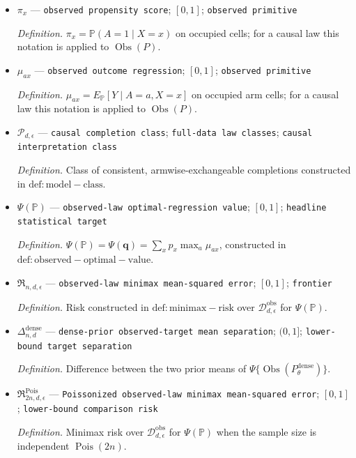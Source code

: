 \documentclass{article}
\begin{document}
\begin{itemize}
  \par\smallskip\noindent\emph{Definition.} \(p_x=\mathbb P(X=x)\); for a causal law this notation is applied to \(\operatorname{Obs}(P)\).
  \item \(\pi_x\) --- \texttt{observed propensity score}; \([0,1]\); \texttt{observed primitive}
  \par\smallskip\noindent\emph{Definition.} \(\pi_x=\mathbb P(A=1\mid X=x)\) on occupied cells; for a causal law this notation is applied to \(\operatorname{Obs}(P)\).
  \item \(\mu_{ax}\) --- \texttt{observed outcome regression}; \([0,1]\); \texttt{observed primitive}
  \par\smallskip\noindent\emph{Definition.} \(\mu_{ax}=E_{\mathbb P}[Y\mid A=a,X=x]\) on occupied arm cells; for a causal law this notation is applied to \(\operatorname{Obs}(P)\).
  \item \(\mathcal P_{d,\epsilon}\) --- \texttt{causal completion class}; \texttt{full-\allowbreak{}data law classes}; \texttt{causal interpretation class}
  \par\smallskip\noindent\emph{Definition.} Class of consistent, armwise-exchangeable completions constructed in \(\mathrm{def:model-class}\).
  \item \(\Psi(\mathbb P)\) --- \texttt{observed-\allowbreak{}law optimal-\allowbreak{}regression value}; \([0,1]\); \texttt{headline statistical target}
  \par\smallskip\noindent\emph{Definition.} \(\Psi(\mathbb P)=\Psi(\mathbf q)=\sum_xp_x\max_a\mu_{ax}\), constructed in \(\mathrm{def:observed-optimal-value}\).
  \item \(\mathfrak R_{n,d,\epsilon}\) --- \texttt{observed-\allowbreak{}law minimax mean-\allowbreak{}squared error}; \([0,1]\); \texttt{frontier}
  \par\smallskip\noindent\emph{Definition.} Risk constructed in \(\mathrm{def:minimax-risk}\) over \(\mathcal D_{d,\epsilon}^{\mathrm{obs}}\) for \(\Psi(\mathbb P)\).
  \item \(\Delta_{n,d}^{\mathrm{dense}}\) --- \texttt{dense-\allowbreak{}prior observed-\allowbreak{}target mean separation}; \((0,1]\); \texttt{lower-\allowbreak{}bound target separation}
  \par\smallskip\noindent\emph{Definition.} Difference between the two prior means of \(\Psi\{\operatorname{Obs}(P_\theta^{\mathrm{dense}})\}\).
  \item \(\mathfrak R^{\mathrm{Pois}}_{2n,d,\epsilon}\) --- \texttt{Poissonized observed-\allowbreak{}law minimax mean-\allowbreak{}squared error}; \([0,1]\); \texttt{lower-\allowbreak{}bound comparison risk}
  \par\smallskip\noindent\emph{Definition.} Minimax risk over \(\mathcal D_{d,\epsilon}^{\mathrm{obs}}\) for \(\Psi(\mathbb P)\) when the sample size is independent \(\operatorname{Pois}(2n)\).
\end{itemize}
\end{document}
